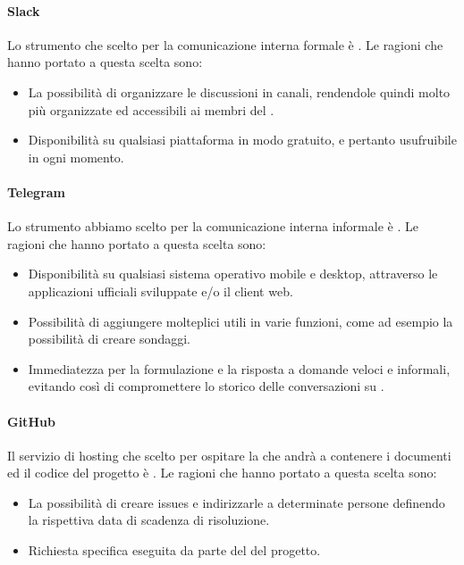 \paragraph{Slack}
Lo strumento che scelto per la comunicazione interna formale è .
Le ragioni che hanno portato a questa scelta sono:
\begin{itemize}
\item La possibilità di organizzare le discussioni in canali, rendendole quindi molto più organizzate ed accessibili ai membri del .
\item Disponibilità su qualsiasi piattaforma in modo gratuito, e pertanto usufruibile in ogni momento.
\end{itemize}

\paragraph{Telegram}
Lo strumento abbiamo scelto per la comunicazione interna informale è .
Le ragioni che hanno portato a questa scelta sono:
\begin{itemize}
\item Disponibilità su qualsiasi sistema operativo mobile e desktop, attraverso le applicazioni ufficiali sviluppate e/o il client web.
\item Possibilità di aggiungere molteplici  utili in varie funzioni, come ad esempio la possibilità di creare sondaggi.
\item Immediatezza per la formulazione e la risposta a domande veloci e informali, evitando così di compromettere lo storico delle conversazioni su .
\end{itemize}

\paragraph{GitHub}
Il servizio di hosting che scelto per ospitare la  che andrà a contenere i documenti ed il codice del progetto è .
Le ragioni che hanno portato a questa scelta sono:
\begin{itemize} 
\item La possibilità di creare issues e indirizzarle a determinate persone definendo la rispettiva data di scadenza di risoluzione.
\item Richiesta specifica eseguita da parte del  del progetto.
\end{itemize}

